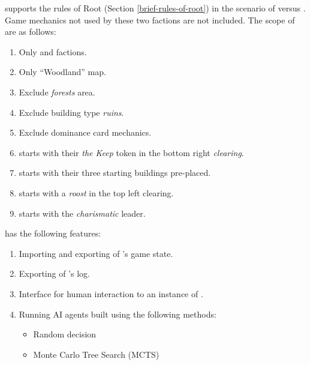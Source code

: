 \RootOurs{} supports the rules of Root (Section \ref{brief-rules-of-root}) in the scenario of \Marquise{} versus \Eyrie{}. Game mechanics not used by these two factions are not included. The scope of \RootOurs{} are as follows:
\begin{enumerate}
    \item Only \Marquise{} and \Eyrie{} factions.
    \item Only ``Woodland'' map.
    \item Exclude \textit{forests} area.
    \item Exclude building type \textit{ruins}.
    \item Exclude dominance card mechanics.
    \item \Marquise{} starts with their \textit{the Keep} token in the bottom right \textit{clearing}.
    \item \Marquise{} starts with their three starting buildings pre-placed.
    \item \Eyrie{} starts with a \textit{roost} in the top left clearing.
    \item \Eyrie{} starts with the \textit{charismatic} leader.
\end{enumerate}

\RootAI{} has the following features:
\begin{enumerate}
    \item Importing and exporting of \RootOurs{}'s game state.
    \item Exporting of \RootOurs{}'s log.
    \item Interface for human interaction to an instance of \RootOurs{}.
    \item Running AI agents built using the following methods:
    \begin{itemize}
        \item Random decision
        \item Monte Carlo Tree Search (MCTS)
    \end{itemize}
\end{enumerate}




